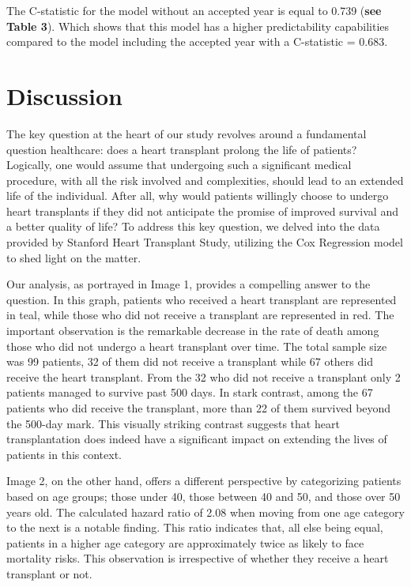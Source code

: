 \documentclass[
  letterpaper,
  DIV=11,
  numbers=noendperiod]{scrreprt}
\begin{document}
The C-statistic for the model without an accepted year is equal to 0.739
(\textbf{see Table 3}). Which shows that this model has a higher
predictability capabilities compared to the model including the accepted
year with a C-statistic = 0.683.

\hypertarget{discussion}{%
\section{Discussion}\label{discussion}}

The key question at the heart of our study revolves around a fundamental
question healthcare: does a heart transplant prolong the life of
patients? Logically, one would assume that undergoing such a significant
medical procedure, with all the risk involved and complexities, should
lead to an extended life of the individual. After all, why would
patients willingly choose to undergo heart transplants if they did not
anticipate the promise of improved survival and a better quality of
life? To address this key question, we delved into the data provided by
Stanford Heart Transplant Study, utilizing the Cox Regression model to
shed light on the matter.

Our analysis, as portrayed in Image 1, provides a compelling answer to
the question. In this graph, patients who received a heart transplant
are represented in teal, while those who did not receive a transplant
are represented in red. The important observation is the remarkable
decrease in the rate of death among those who did not undergo a heart
transplant over time. The total sample size was 99 patients, 32 of them
did not receive a transplant while 67 others did receive the heart
transplant. From the 32 who did not receive a transplant only 2 patients
managed to survive past 500 days. In stark contrast, among the 67
patients who did receive the transplant, more than 22 of them survived
beyond the 500-day mark. This visually striking contrast suggests that
heart transplantation does indeed have a significant impact on extending
the lives of patients in this context.

Image 2, on the other hand, offers a different perspective by
categorizing patients based on age groups; those under 40, those between
40 and 50, and those over 50 years old. The calculated hazard ratio of
2.08 when moving from one age category to the next is a notable finding.
This ratio indicates that, all else being equal, patients in a higher
age category are approximately twice as likely to face mortality risks.
This observation is irrespective of whether they receive a heart
transplant or not.
\end{document}
